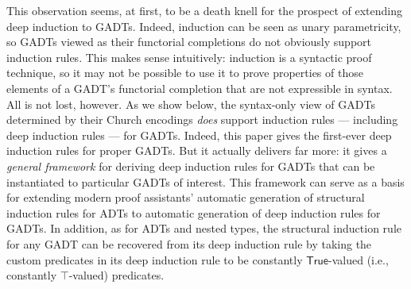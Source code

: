 \documentclass[sigplan,10pt]{acmart}
\begin{document}
This observation seems, at first, to be a death knell for the prospect
of extending deep induction to GADTs. Indeed, induction can be seen as
unary parametricity, so GADTs viewed as their functorial completions
do not obviously support induction rules.  This makes sense
intuitively: induction is a syntactic proof technique, so it may not
be possible to use it to prove properties of those elements of a
GADT's functorial completion that are not expressible in syntax. All
is not lost, however. As we show below, the syntax-only view of GADTs
determined by their Church encodings {\em does} support induction
rules --- including deep induction rules --- for GADTs. Indeed, this
paper gives the first-ever deep induction rules
for proper GADTs.
But it actually delivers far more: it gives a {\em general framework}
for deriving deep induction rules for GADTs that can be instantiated
to particular GADTs of interest. This framework can serve as a basis
for extending modern proof assistants' automatic generation of
structural induction rules for ADTs to automatic generation of deep
induction rules for GADTs. In addition, as for ADTs and nested types,
the structural induction rule for any GADT can be recovered from its
deep induction rule by taking the custom predicates in its deep
induction rule to be constantly $\mathsf{True}$-valued (i.e.,
constantly $\mathsf{\top}$-valued) predicates.
\end{document}
